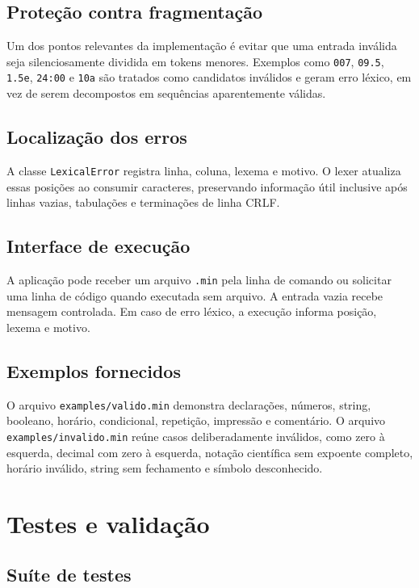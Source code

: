 \documentclass[12pt,a4paper,oneside]{report}
\begin{document}
\section{Proteção contra fragmentação}

Um dos pontos relevantes da implementação é evitar que uma entrada inválida seja silenciosamente dividida em tokens menores. Exemplos como \texttt{007}, \texttt{09.5}, \texttt{1.5e}, \texttt{24:00} e \texttt{10a} são tratados como candidatos inválidos e geram erro léxico, em vez de serem decompostos em sequências aparentemente válidas.

\section{Localização dos erros}

A classe \texttt{LexicalError} registra linha, coluna, lexema e motivo. O lexer atualiza essas posições ao consumir caracteres, preservando informação útil inclusive após linhas vazias, tabulações e terminações de linha CRLF.

\section{Interface de execução}

A aplicação pode receber um arquivo \texttt{.min} pela linha de comando ou solicitar uma linha de código quando executada sem arquivo. A entrada vazia recebe mensagem controlada. Em caso de erro léxico, a execução informa posição, lexema e motivo.

\section{Exemplos fornecidos}

O arquivo \texttt{examples/valido.min} demonstra declarações, números, string, booleano, horário, condicional, repetição, impressão e comentário. O arquivo \texttt{examples/invalido.min} reúne casos deliberadamente inválidos, como zero à esquerda, decimal com zero à esquerda, notação científica sem expoente completo, horário inválido, string sem fechamento e símbolo desconhecido.



\chapter{Testes e validação}

\section{Suíte de testes}
\end{document}
